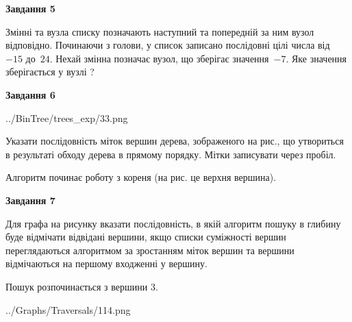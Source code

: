 \documentclass[12pt, ukrainian]{article}
\begin{document}
{\begin {large}
{\begin {center}\textbf{Завдання 5}\end {center}}\par
Змінні  та  вузла списку позначають наступний та попередній за ним вузол відповідно. Починаючи з голови, у список записано послідовні цілі числа від~$-15$ до~$24$. Нехай змінна  позначає вузол, що зберігає значення~$-7$.
Яке значення зберігається у вузлі  ?\par
\newpage

{\begin {center}\textbf{Завдання 6}\end {center}}\par

\begin{center}
	{../BinTree/trees_exp/33.png}
\end{center}
Указати послідовність міток вершин дерева, зображеного на рис., що утвориться в результаті обходу дерева в прямому порядку. Мітки записувати через пробіл.\par Алгоритм починає роботу з кореня (на рис. це верхня вершина).\par
\newpage

{\begin {center}\textbf{Завдання 7}\end {center}}\par
Для графа на рисунку вказати послідовність, в якій алгоритм пошуку в глибину буде відмічати відвідані вершини, якщо списки суміжності вершин переглядаються алгоритмом за зростанням міток вершин та вершини відмічаються на першому вход\-женні у вершину.\par
Пошук розпочинається з вершини 3.\par

\begin{center}
	{../Graphs/Traversals/114.png}
\end{center}\par
\newpage


\end{large}}
\end{document}

